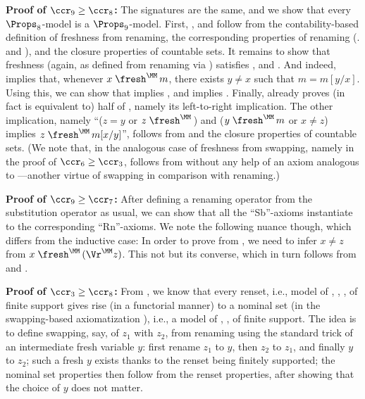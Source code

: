 \textbf{Proof of $\ccr_{9} \geq \ccr_{8}$:} 
The signatures are the same, and we show that every $\Props_8$-model is a $\Props_9$-model. 
%
First, \IFrVr{}, \IFrAp{} and \IFrLm{} follow from the \IFrDRn{} contability-based definition of freshness from renaming, the corresponding properties of renaming (\IRnVr{}. \IRnAp{} and \IRnLmO{}), and the closure properties of countable sets. 
%
It remains to show that freshness (again, as defined from renaming via \IFrDRn{})  satisfies \IRnFr{}, \IRnChFr{} and \IFrRn{}. 
And indeed, \IFrDRn{} implies that, whenever 
$x \;\fresh^\MM\, m$, there exists $y\not=x$ such that $m=m[y/x]$. Using this, we can show that \IRnIm{} implies \IRnFr{}, and \IRnCh{} implies \IRnChFr{}. Finally, \IFrRnT{} already proves (in fact is equivalent to) half of \IFrRn{}, namely its left-to-right implication. The other implication, namely 
``($z = y$ or $z \;\fresh^\MM\,$) and ($y \;\fresh^\MM\,m$ or $x \not= z$) implies 
  $z \;\fresh^\MM\,m[x / y]$'', follows from  \IFrDRn{} and the closure properties of countable sets. 
 (We note that, in the analogous case of freshness from swapping, namely in the proof of $\ccr_6\geq \ccr_3$,  
   \IFrSw{} follows from \IFvDSw{} without any help of an axiom analogous to \IFrRnT{}---another virtue of swapping in comparison with renaming.)
   
\textbf{Proof of $\ccr_{9} \geq \ccr_{7}$:}  
After defining a renaming operator from the substitution operator 
as usual, we can show that all the ``\textrm{Sb}''-axioms instantiate to the corresponding ``\textrm{Rn}''-axioms.  
We note the following nuance though, which differs from the inductive case: In order to prove \IRnLmO{} from \ISbLm{}, we need to infer $x\not=z$ from $x\;\fresh^\MM\,(\Vr^\MM z)$. This not \IFrVr{} but its converse, which in turn follows from \VrInv{} and  \FrVr{}. 



\textbf{Proof of $\ccr_{3} \geq \ccr_{8}$:}  
%
From \cite{DBLP:conf/cade/Popescu22}, we know that every renset,  i.e., model of \IRnId{}, \IRnIm{}, \IRnCh{}, \IRnCm{}  
of finite support 
gives rise (in a functorial manner) to a nominal set (in the swapping-based axiomatization \cite[Section 6.1]{pitts_2013}), i.e., a model of \ISwId{}, \ISwIv{}, \ISwCp{}  
of finite support. 
%
%
The idea is to define swapping, say, of $z_1$ with $z_2$, from renaming using the standard trick of an intermediate fresh variable $y$: first rename $z_1$ to $y$, then $z_2$ to $z_1$, and finally $y$ to $z_2$; such a fresh $y$ exists thanks to the renset being finitely supported; the nominal set properties then follow from the renset properties, after showing that the choice of $y$ does not matter. 

